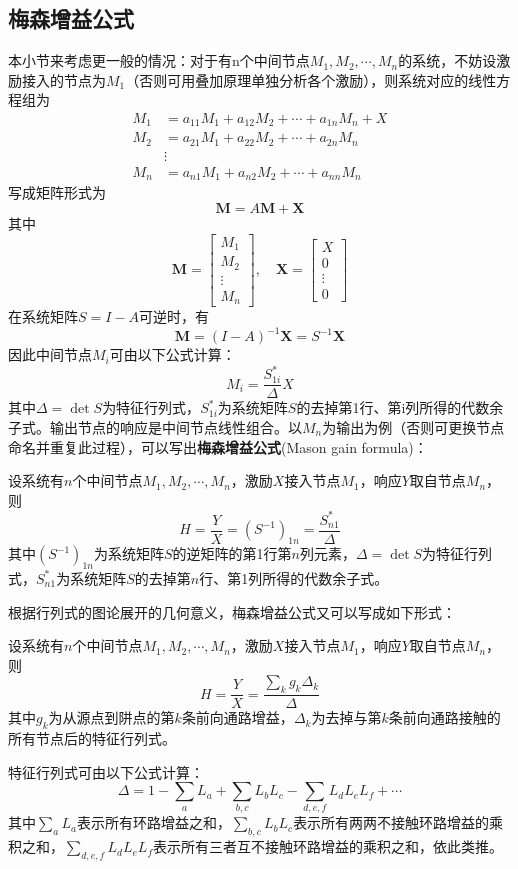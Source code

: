 \subsection{梅森增益公式}\label{sub:mason_gain}

本小节来考虑更一般的情况：对于有n个中间节点$M_1,M_2,\cdots,M_n$的系统，不妨设激励接入的节点为$M_1$（否则可用叠加原理单独分析各个激励），则系统对应的线性方程组为\begin{align*}
    M_1&=a_{11} M_1 + a_{12} M_2 + \cdots + a_{1n} M_n + X\\
    M_2&=a_{21} M_1 + a_{22} M_2 + \cdots + a_{2n} M_n\\
    &\vdots\\
    M_n&=a_{n1} M_1 + a_{n2} M_2 + \cdots + a_{nn} M_n
\end{align*}
写成矩阵形式为
\[\mathbf{M}=A\mathbf{M}+\mathbf{X}\]
其中$$\mathbf{M}=\begin{bmatrix}
    M_1 \\
    M_2 \\
    \vdots \\
    M_n
\end{bmatrix},\quad\mathbf{X}=\begin{bmatrix}
    X \\
    0 \\
    \vdots \\
    0
\end{bmatrix}$$
在系统矩阵$S=I-A$可逆时，有
\[\mathbf{M}=(I-A)^{-1}\mathbf{X}=S^{-1}\mathbf{X}\]
因此中间节点$M_i$可由以下公式计算：\[M_i=\frac{S^*_{1i}}{\Delta} X\]
其中$\Delta=\det S$为特征行列式，$S^*_{1i}$为系统矩阵$S$的去掉第1行、第i列所得的代数余子式。输出节点的响应是中间节点线性组合。以$M_n$为输出为例（否则可更换节点命名并重复此过程），可以写出\textbf{梅森增益公式}(Mason gain formula)：
\begin{theorem}[梅森增益公式]
    设系统有$n$个中间节点$M_1,M_2,\cdots,M_n$，激励$X$接入节点$M_1$，响应$Y$取自节点$M_n$，则
    \[H=\frac{Y}{X}=(S^{-1})_{1n}=\frac{S^*_{n1}}{\Delta}\]
    其中$(S^{-1})_{1n}$为系统矩阵$S$的逆矩阵的第1行第$n$列元素，$\Delta=\det S$为特征行列式，$S^*_{n1}$为系统矩阵$S$的去掉第$n$行、第1列所得的代数余子式。
\end{theorem}

根据行列式的图论展开的几何意义，梅森增益公式又可以写成如下形式：
\begin{theorem}\label{thm:mason_gain}
    设系统有$n$个中间节点$M_1,M_2,\cdots,M_n$，激励$X$接入节点$M_1$，响应$Y$取自节点$M_n$，则
    \[H=\frac{Y}{X}=\frac{\sum_{k}g_k\Delta_k}{\Delta}\]
    其中$g_k$为从源点到阱点的第$k$条前向通路增益，$\Delta_k$为去掉与第$k$条前向通路接触的所有节点后的特征行列式。

    特征行列式可由以下公式计算：
    $$\Delta=1-\sum_a L_a+\sum_{b,c}L_b L_c-\sum_{d,e,f}L_d L_e L_f+\cdots$$
    其中$\sum_a L_a$表示所有环路增益之和，$\sum_{b,c}L_b L_c$表示所有两两不接触环路增益的乘积之和，$\sum_{d,e,f}L_d L_e L_f$表示所有三者互不接触环路增益的乘积之和，依此类推。
\end{theorem}

